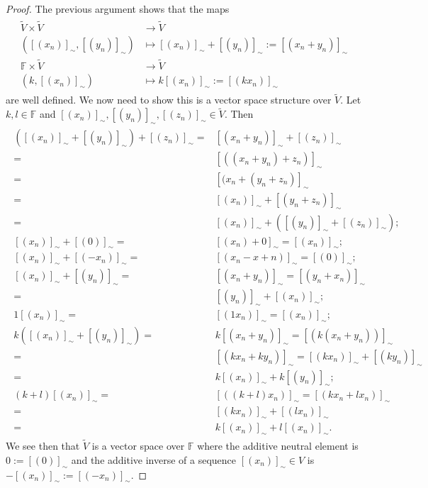 \begin{proof}
	The previous argument shows that the maps
		\begin{align}
		\begin{split}
			\tilde{V}\times\tilde{V}&\rightarrow\tilde{V}\\
			([(x_n)]_\sim,[(y_n)]_\sim)&\mapsto[(x_n)]_\sim+[(y_n)]_\sim:=[(x_n+y_n)]_\sim\\
			\mathbb{F}\times\tilde{V}&\rightarrow\tilde{V}\\
			(k,[(x_n)]_\sim)&\mapsto k[(x_n)]_\sim:=[(kx_n)]_\sim
		\end{split}
		\end{align}
are well defined. We now need to show this is a vector space structure over $\tilde{V}$. Let $k,l\in\mathbb{F}$ and $[(x_n)]_\sim,[(y_n)]_\sim,[(z_n)]_\sim\in\tilde{V}$. Then
	\begin{align}
	\begin{split}
		([(x_n)]_\sim+[(y_n)]_\sim)+[(z_n)]_\sim=&[(x_n+y_n)]_\sim+[(z_n)]_\sim\\
		=&[((x_n+y_n)+z_n)]_\sim\\
		=&[(x_n+(y_n+z_n)]_\sim\\
		=&[(x_n)]_\sim+[(y_n+z_n)]_\sim\\
		=&[(x_n)]_\sim+([(y_n)]_\sim+[(z_n)]_\sim);\\
		[(x_n)]_\sim+[(0)]_\sim=&[(x_n)+0]_\sim=[(x_n)]_\sim;\\
		[(x_n)]_\sim+[(-x_n)]_\sim=&[(x_n-x+n)]_\sim=[(0)]_\sim;\\
		[(x_n)]_\sim+[(y_n)]_\sim=&[(x_n+y_n)]_\sim=[(y_n+x_n)]_\sim\\
		=&[(y_n)]_\sim+[(x_n)]_\sim;\\
		1[(x_n)]_\sim=&[(1x_n)]_\sim=[(x_n)]_\sim;\\
		k([(x_n)]_\sim+[(y_n)]_\sim)=&k[(x_n+y_n)]_\sim=[(k(x_n+y_n))]_\sim\\
		=&[(kx_n+ky_n)]_\sim=[(kx_n)]_\sim+[(ky_n)]_\sim\\
		=&k[(x_n)]_\sim+k[(y_n)]_\sim;\\
		(k+l)[(x_n)]_\sim=&[((k+l)x_n)]_\sim=[(kx_n+lx_n)]_\sim\\
		=&[(kx_n)]_\sim+[(lx_n)]_\sim\\
		=&k[(x_n)]_\sim+l[(x_n)]_\sim.
	\end{split}
	\end{align}
We see then that $\tilde{V}$ is a vector space over $\mathbb{F}$ where the additive neutral element is $0:=[(0)]_\sim$ and the additive inverse of a sequence $[(x_n)]_\sim\in V$ is $-[(x_n)]_\sim:=[(-x_n)]_\sim$.


\end{proof}
